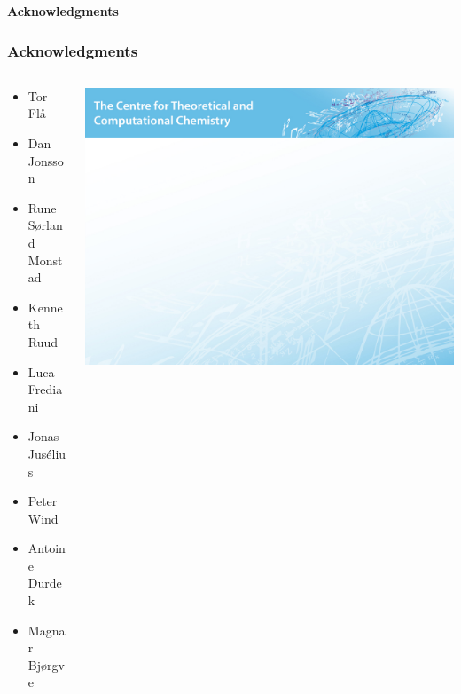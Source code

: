 \begin{frame}
    \centering
    \textbf{\Large{Acknowledgments}}
\end{frame}

\begin{frame}
    \frametitle{Acknowledgments}
    \large
    \begin{columns}
    \begin{column}[b]{0.5\linewidth}
    \begin{itemize}
    	\item Tor Fl{\aa}
    	\item Dan Jonsson
    	\item Rune S{\o}rland Monstad
        \item Kenneth Ruud
	\item Luca Frediani
    \end{itemize}

    \vspace{5mm}

    \begin{itemize}
    	\item Jonas Jus{\'e}lius
    	\item Peter Wind
	\item Antoine Durdek
    	\item Magnar Bj{\o}rgve
    \end{itemize}

    \vspace{5mm}

    \end{column}
    \begin{column}[b]{0.5\linewidth}
	\centering
	\includegraphics[scale=0.4, clip, viewport = 0 300 400 400]{figures/ctcc_forside.jpg}\\


\end{column}
\end{columns}
\end{frame}
